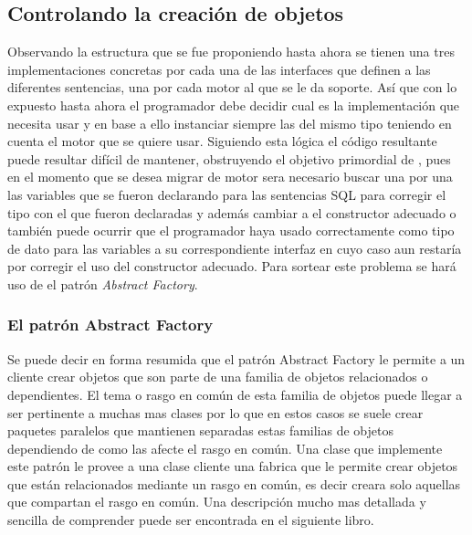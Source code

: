 \subsection{Controlando la creación de objetos}
Observando la estructura que se fue proponiendo hasta ahora se tienen una tres implementaciones concretas por cada una de las interfaces que definen a las diferentes sentencias, una por cada motor al que se le da soporte. Así que con lo expuesto hasta ahora el programador debe decidir cual es la implementación que necesita usar y en base a ello instanciar siempre las del mismo tipo teniendo en cuenta el motor que se quiere usar. Siguiendo esta lógica el código resultante puede resultar difícil de mantener, obstruyendo el objetivo primordial de \jj,  pues en el momento que se desea migrar de motor sera necesario buscar una por una las variables que se fueron declarando para las sentencias SQL para corregir el tipo con el que fueron declaradas y además cambiar a el constructor adecuado o también puede ocurrir que el programador haya usado correctamente como tipo de dato para las variables a su correspondiente interfaz en cuyo caso aun restaría por corregir el uso del constructor adecuado. Para sortear este problema se hará uso de el patrón \textit{Abstract Factory}.
%
\subsubsection{El patrón Abstract Factory}
Se puede decir en forma resumida que el patrón Abstract Factory le permite a un cliente crear objetos que son parte de una familia de objetos relacionados o dependientes. El tema o rasgo en común de esta familia de objetos puede llegar a ser pertinente a muchas mas clases por lo que en estos casos se suele crear paquetes paralelos que mantienen separadas estas familias de objetos dependiendo de como las afecte el rasgo en común. Una clase que implemente este patrón le provee a una clase cliente una fabrica que le permite crear objetos que están relacionados mediante un rasgo en común, es decir creara solo aquellas que compartan el rasgo en común. Una descripción mucho mas detallada y sencilla de comprender puede ser encontrada en el siguiente libro\cite{Metsker:2002:DPJ}. 

